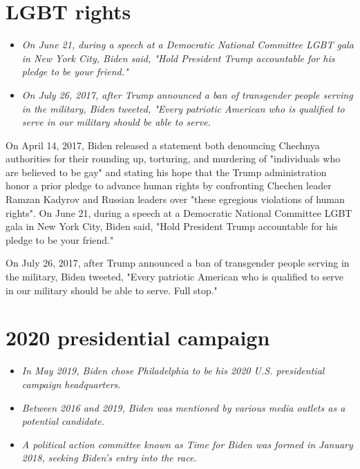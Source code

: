\section{LGBT rights}\label{lgbt-rights}

\begin{itemize}
\item
  \emph{On June 21, during a speech at a Democratic National Committee
  LGBT gala in New York City, Biden said, "Hold President Trump
  accountable for his pledge to be your friend."}
\item
  \emph{On July 26, 2017, after Trump announced a ban of transgender
  people serving in the military, Biden tweeted, "Every patriotic
  American who is qualified to serve in our military should be able to
  serve.}
\end{itemize}

On April 14, 2017, Biden released a statement both denouncing Chechnya
authorities for their rounding up, torturing, and murdering of
"individuals who are believed to be gay" and stating his hope that the
Trump administration honor a prior pledge to advance human rights by
confronting Chechen leader Ramzan Kadyrov and Russian leaders over
"these egregious violations of human rights". On June 21, during a
speech at a Democratic National Committee LGBT gala in New York City,
Biden said, "Hold President Trump accountable for his pledge to be your
friend."

On July 26, 2017, after Trump announced a ban of transgender people
serving in the military, Biden tweeted, "Every patriotic American who is
qualified to serve in our military should be able to serve. Full stop."

\section{2020 presidential campaign}\label{presidential-campaign-2}

\begin{itemize}
\item
  \emph{In May 2019, Biden chose Philadelphia to be his 2020 U.S.
  presidential campaign headquarters.}
\item
  \emph{Between 2016 and 2019, Biden was mentioned by various media
  outlets as a potential candidate.}
\item
  \emph{A political action committee known as Time for Biden was formed
  in January 2018, seeking Biden's entry into the race.}
\end{itemize}

